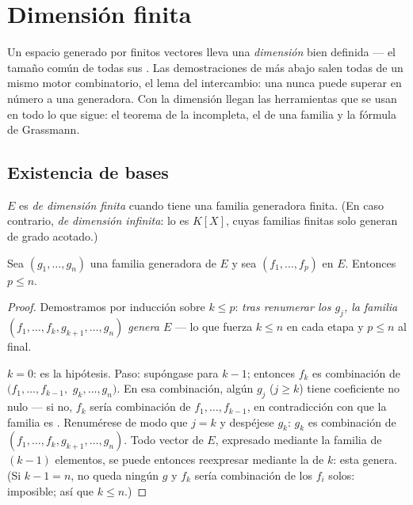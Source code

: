 \chapter{Dimensión finita}\label{ch:b1:findim}

Un espacio generado por finitos vectores lleva una \emph{dimensión}
bien definida --- el tamaño común de todas sus . Las
demostraciones de más abajo salen todas de un mismo motor
combinatorio, el lema del intercambio: una  nunca puede
superar en número a una generadora. Con la dimensión llegan las
herramientas que se usan en todo lo que sigue: el teorema de la 
incompleta, el  de una familia y la fórmula de Grassmann.

\section{Existencia de bases}

\begin{definition}\label{def:b1:findim:def}
$E$ es \emph{de dimensión finita} cuando
tiene una familia generadora finita. (En caso contrario, \emph{de
dimensión infinita}: lo es $K[X]$, cuyas familias finitas solo
generan  de grado acotado.)
\end{definition}

\begin{theorem}\label{thm:b1:findim:exchange}
Sea $(g_1, \dots, g_n)$ una familia generadora de $E$ y sea
$(f_1, \dots, f_p)$  en $E$. Entonces $p \leq n$.
\end{theorem}

\begin{proof}
Demostramos por inducción sobre $k \leq p$: \emph{tras renumerar los
$g_j$, la familia $(f_1, \dots, f_k, g_{k+1}, \dots, g_n)$ genera
$E$} --- lo que fuerza $k \leq n$ en cada etapa y $p \leq n$ al final.

$k = 0$: es la hipótesis. Paso: supóngase para $k - 1$; entonces
$f_k$ es combinación de $(f_1, \dots, f_{k-1},$ $g_k, \dots, g_n)$.
En esa combinación, algún $g_j$ ($j \geq k$) tiene coeficiente no
nulo --- si no, $f_k$ sería combinación de $f_1, \dots, f_{k-1}$, en
contradicción con que la familia es . Renumérese de modo que
$j = k$ y despéjese $g_k$: $g_k$ es combinación de
$(f_1, \dots, f_k, g_{k+1}, \dots, g_n)$. Todo vector de $E$,
expresado mediante la familia de $(k-1)$ elementos, se puede entonces
reexpresar mediante la de $k$: esta genera. (Si $k - 1 = n$, no queda
ningún $g$ y $f_k$ sería combinación de los $f_i$ solos: imposible;
así que $k \leq n$.)
\end{proof}


